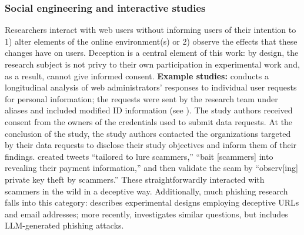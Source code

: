 \subsubsection{Social engineering and interactive studies}
\label{sec:soc_eng}
Researchers interact with web users without informing users of their intention to 1) alter elements of the online environment(s) or 2) observe the effects that these changes have on users. Deception is a central element of this work: by design, the research subject is not privy to their own participation in experimental work and, as a result, cannot give informed consent. \textbf{Example studies:} \cite{di2022revisiting} conducts a longitudinal analysis of web administrators' responses to individual user requests for personal information; the requests were sent by the research team under aliases and included modified ID information (see ). The study authors received consent from the owners of the credentials used to submit data requests. At the conclusion of the study, the study authors contacted the organizations targeted by their data requests to disclose their study objectives and inform them of their findings. 
\cite{acharyaConningCryptoConman2024} created tweets ``tailored to lure scammers,''  ``bait [scammers] into revealing their payment information,'' and then validate the scam by ``observ[ing] private key theft by scammers.''  These straightforwardly interacted with scammers in the wild in a deceptive way.
Additionally, much phishing research falls into this category: \cite{jakobssonWhyHowPerform2008} describes experimental designs employing deceptive URLs and email addresses; more recently, \cite{royChatbotsPhishbotsPhishing2024} investigates similar questions, but includes LLM-generated phishing attacks.

